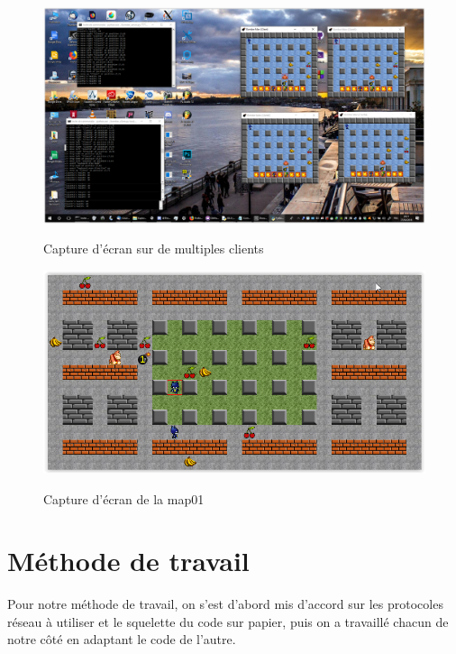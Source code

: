 \documentclass[a4paper]{article}
\begin{document}
\begin{center}

\begin{figure}[!htbp]
	\centering
	\includegraphics[width=\textwidth]{IMG_Latex/multiecran.png}\\
	\caption{Capture d'écran sur de multiples clients}
	\label{shema/cp/multiple}
\end{figure}

\begin{figure}[!htbp]
	\centering
	\includegraphics[width=\textwidth]{IMG_Latex/map01.png}\\
	\caption{Capture d'écran de la map01}
	\label{shema/cp/map01}
\end{figure}

\end{center}


\newpage
	\section{Méthode de travail}

	Pour notre méthode de travail, on s'est d'abord mis d'accord sur les protocoles réseau à utiliser et le squelette du code sur papier, puis on a travaillé chacun de notre côté en adaptant le code de l'autre.
\end{document}
